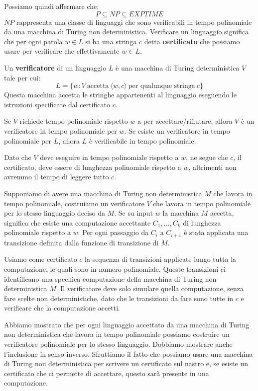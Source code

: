 Possiamo quindi affermare che:
\begin{equation}
    P \subseteq NP \subseteq EXPTIME
\end{equation}
$NP$ rappresenta una classe di linguaggi che sono verificabili in tempo polinomiale
da una macchina di Turing non deterministica. Verificare un linguaggio significa
che per ogni parola $w \in L$ si ha una stringa $c$ detta \textbf{certificato} che
possiamo usare per verificare che effettivamente $w \in L$.
\begin{definizione}
    Un \textbf{verificatore} di un linguaggio $L$ è una macchina di Turing
    deterministica $V$ tale per cui:
    \begin{equation}
        L = \{w : V \ \text{accetta} \ \langle w, c \rangle \ \text{per qualunque stringa} \ c\}
    \end{equation}
    Questa macchina accetta le stringhe appartenenti al linguaggio eseguendo le
    istruzioni specificate dal certificato $c$.
\end{definizione}
Se $V$ richiede tempo polinomiale rispetto $w$ a per accettare/rifiutare, allora
$V$ è un verificatore in tempo polinomiale per $w$. Se esiste un verificatore in
tempo polinomiale per $L$, allora $L$ è verificabile in tempo polinomiale.

Dato che $V$ deve eseguire in tempo polinomiale rispetto a $w$, ne segue che $c$,
il certificato, deve essere di lunghezza polinomiale rispetto a $w$, altrimenti
non avremmo il tempo di leggere tutto $c$.

Supponiamo di avere una macchina di Turing non deterministica $M$ che lavora in
tempo polinomiale, costruiamo un verificatore $V$ che lavora in tempo polinomiale
per lo stesso linguaggio deciso da $M$. Se su input $w$ la macchina $M$ accetta,
significa che esiste una computazione accettante $C_1, \dots, C_k$ di lunghezza
polinomiale rispetto a $w$. Per ogni passaggio da $C_i$ a $C_{i + 1}$ è stata applicata
una transizione definita dalla funzione di transizione di $M$.

Usiamo come certificato $c$ la sequenza di transizioni applicate lungo tutta la
computazione, le quali sono in numero polinomiale. Queste transizioni ci identificano
una specifica computazione della macchina di Turing non deterministica $M$.
Il verificatore deve solo simulare quella computazione, senza fare scelte non
deterministiche, dato che le transizioni da fare sono tutte in $c$ e verificare
che la computazione accetti.

Abbiamo mostrato che per ogni linguaggio accettato da una macchina di Turing non
deterministica che lavora in tempo polinomiale possiamo costruire un verificatore
polinomiale per lo stesso linguaggio. Dobbiamo mostrare anche l'inclusione in senso
inverso. Sfruttiamo il fatto che possiamo usare una macchina di Turing non
deterministica per scrivere un certificato sul nastro e, se esiste un certificato
che ci permette di accettare, questo sarà presente in una computazione.

